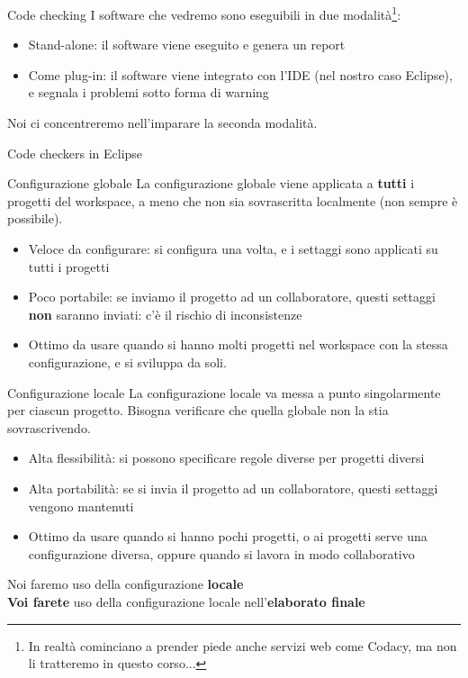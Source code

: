 \documentclass[presentation]{beamer}
\begin{document}
\begin{frame}[allowframebreaks]{Code checking}
	I software che vedremo sono eseguibili in due modalità\footnote{In realtà cominciano a prender piede anche servizi web come Codacy, ma non li tratteremo in questo corso...}:
	\begin{itemize}
		\item Stand-alone: il software viene eseguito e genera un report
		\item Come plug-in: il software viene integrato con l'IDE (nel nostro caso Eclipse), e segnala i problemi sotto forma di warning
	\end{itemize}
	Noi ci concentreremo nell'imparare la seconda modalità.
\end{frame}
\begin{frame}[allowframebreaks]{Code checkers in Eclipse}
	\begin{block}{Configurazione globale}
	La configurazione globale viene applicata a \textbf{tutti} i progetti del workspace, a meno che non sia sovrascritta localmente (non sempre è possibile).
		\begin{itemize}
			\item Veloce da configurare: si configura una volta, e i settaggi sono applicati su tutti i progetti
			\item Poco portabile: se inviamo il progetto ad un collaboratore, questi settaggi \textbf{non} saranno inviati: c'è il rischio di inconsistenze
			\item Ottimo da usare quando si hanno molti progetti nel workspace con la stessa configurazione, e si sviluppa da soli.
		\end{itemize}
	\end{block}
	\begin{block}{Configurazione locale}
	La configurazione locale va messa a punto singolarmente per ciascun progetto. Bisogna verificare che quella globale non la stia sovrascrivendo.
		\begin{itemize}
			\item Alta flessibilità: si possono specificare regole diverse per progetti diversi
			\item Alta portabilità: se si invia il progetto ad un collaboratore, questi settaggi vengono mantenuti
			\item Ottimo da usare quando si hanno pochi progetti, o ai progetti serve una configurazione diversa, oppure quando si lavora in modo collaborativo
		\end{itemize}
	\end{block}
	\begin{center}
		Noi faremo uso della configurazione \textbf{locale} \\
		\textbf{Voi farete} uso della configurazione locale nell'\textbf{elaborato finale}
	\end{center}

\end{frame}
\end{document}
